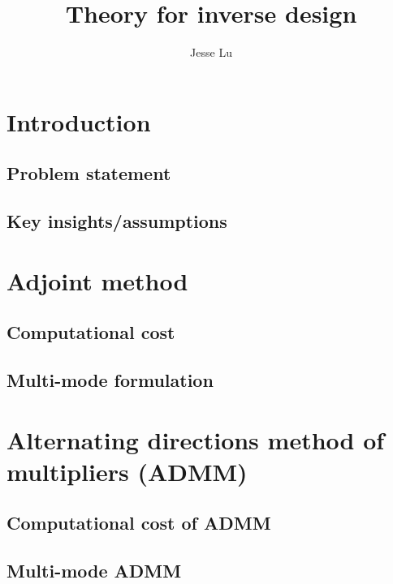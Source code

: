 \documentclass{article}
\title{Theory for inverse design}
\author{Jesse Lu}
\begin{document}
\maketitle
\tableofcontents
\section{Introduction}
\subsection{Problem statement}
\subsection{Key insights/assumptions}
\section{Adjoint method}
\subsection{Computational cost}
\subsection{Multi-mode formulation}
\section{Alternating directions method of multipliers (ADMM)}
\subsection{Computational cost of ADMM}
\subsection{Multi-mode ADMM}
\end{document}
